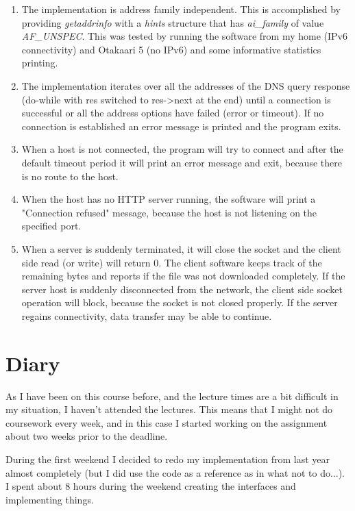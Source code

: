 \documentclass[a4paper,12pt]{article}
\begin{document}
\begin{enumerate}
\item The implementation is address family independent. This is accomplished by providing \emph{getaddrinfo} with a \emph{hints} structure that has \emph{ai\_family} of value \emph{AF\_UNSPEC}. This was tested by running the software from my home (IPv6 connectivity) and Otakaari 5 (no IPv6) and some informative statistics printing.
\item The implementation iterates over all the addresses of the DNS query response (do-while with res switched to res->next at the end) until a connection is successful or all the address options have failed (error or timeout). If no connection is established an error message is printed and the program exits.
\item When a host is not connected, the program will try to connect and after the default timeout period it will print an error message and exit, because there is no route to the host.
\item When the host has no HTTP server running, the software will print a "Connection refused" message, because the host is not listening on the specified port.
\item When a server is suddenly terminated, it will close the socket and the client side read (or write) will return 0. The client software keeps track of the remaining bytes and reports if the file was not downloaded completely. If the server host is suddenly disconnected from the network, the client side socket operation will block, because the socket is not closed properly. If the server regains connectivity, data transfer may be able to continue.
\end{enumerate}

\section{Diary}

As I have been on this course before, and the lecture times are a bit difficult in my situation, I haven't attended the lectures. This means that I might not do coursework every week, and in this case I started working on the assignment about two weeks prior to the deadline.

During the first weekend I decided to redo my implementation from last year almost completely (but I did use the code as a reference as in what not to do...). I spent about 8 hours during the weekend creating the interfaces and implementing things.
\end{document}
